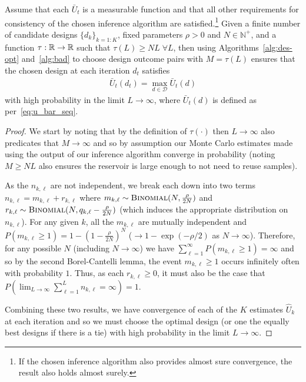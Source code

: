 \begin{theorem}
	Assume that each $\bar{U}_t$ is a measurable function and 
	that all other requirements for consistency of the chosen inference algorithm are satisfied.\footnote{If the
		chosen inference algorithm also provides almost sure convergence, the result also holds almost surely.}
	Given a finite number of candidate designs $\{d_k\}_{k=1:K}$, fixed parameters $\rho>0$ and $N\in\mathbb{N}^{+}$, and a
	function $\tau : \mathbb{R} \rightarrow \mathbb{R}$ such that $\tau(L)\ge NL \; \forall L$, then using
	Algorithms~\ref{alg:des-opt} and~\ref{alg:bad} to choose design outcome pairs with $M=\tau(L)$
	ensures that the chosen design at each iteration $d_t$ satisfies
	\begin{align}
	\bar{U}_t(d_t)= \max_{d\in\mathcal{D}} \bar{U}_t(d)
	\end{align}
	with high probability in the limit $L\rightarrow\infty$, where 
	$\bar{U}_t(d)$ is defined as per~\eqref{eq:u_bar_seq}.
\end{theorem}
\begin{proof}
	We start by noting that by the definition of $\tau(\cdot)$ then $L\rightarrow\infty$ also predicates
	that $M\rightarrow\infty$ and so by assumption our Monte Carlo estimates made using the output
	of our inference algorithm converge in probability (noting $M\ge NL$ also ensures the reservoir is
	large enough to not need to reuse samples).
	
	As the $n_{k,\ell}$ are not independent, we break each down into two terms
	$n_{k,\ell} = m_{k,\ell}+r_{k,\ell}$ where $m_{k,\ell} \sim \textsc{Binomial}(N,\frac{\rho}{2N})$ and
	$r_{k,\ell} \sim \textsc{Binomial}(N,q_{k,{\ell}}-\frac{\rho}{2N})$ (which induces the appropriate distribution
	on $n_{k,\ell}$).  For any given $k$, all the $m_{k,\ell}$
	are mutually independent and $P(m_{k,\ell} \ge 1) = 1-(1-\frac{\rho}{2N})^N$ ($\rightarrow 1-\exp (-\rho/2)$ 
	as $N\rightarrow\infty$).  Therefore, for any possible $N$ (including $N\rightarrow\infty$) 
	we have $\sum_{\ell=1}^{\infty} P(m_{k,\ell} \ge 1) = \infty$
	and so by the second Borel-Cantelli lemma, the event $m_{k,\ell} \ge 1$ occurs infinitely often with probability $1$.
	Thus, as each $r_{k,\ell}\ge0$, it must also be the case that
	$P(\lim_{L\rightarrow\infty} \sum_{\ell=1}^{L} n_{k,\ell} = \infty) = 1$.
	
	Combining these two results, we have convergence of each of the $K$ estimates $\hat{U}_k$
	at each iteration and so we must choose the optimal design (or one
	the equally best designs if there is a tie)  with high probability in the limit $L\rightarrow\infty$.
\end{proof}